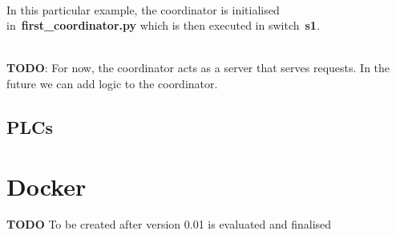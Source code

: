 \documentclass[book,a4paper,12pt,oneside]{memoir}
\begin{document}
\noindent \\ In this particular example, the coordinator is initialised in~\textbf{first\_coordinator.py} which is then executed in switch~\textbf{s1}.

\noindent \\\textbf{TODO}: For now, the coordinator acts as a server that serves requests.  In the future we can add logic to the coordinator.


\section{PLCs}
\label{cha:basicuse-sec:plcs}



\chapter{Docker}
\label{cha:docker}
\textbf{TODO} To be created after version 0.01 is evaluated and finalised

\begin{lstlisting}[backgroundcolor = \color{ultralightgray}, language = Python, xleftmargin = 0.1cm, framexleftmargin = 0.3em, showstringspaces=false]

\end{lstlisting}

\backmatter
\end{document}
